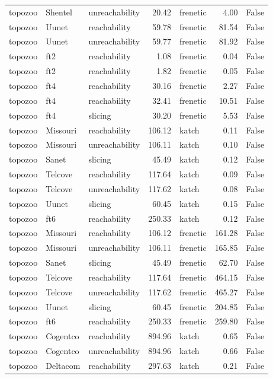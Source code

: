 \begin{tabular}{lllrlrr}
topozoo & Shentel & unreachability & 20.42 & frenetic & 4.00 & False \\
topozoo & Uunet & reachability & 59.78 & frenetic & 81.54 & False \\
topozoo & Uunet & unreachability & 59.77 & frenetic & 81.92 & False \\
topozoo & ft2 & reachability & 1.08 & frenetic & 0.04 & False \\
topozoo & ft2 & reachability & 1.82 & frenetic & 0.05 & False \\
topozoo & ft4 & reachability & 30.16 & frenetic & 2.27 & False \\
topozoo & ft4 & reachability & 32.41 & frenetic & 10.51 & False \\
topozoo & ft4 & slicing & 30.20 & frenetic & 5.53 & False \\
topozoo & Missouri & reachability & 106.12 & katch & 0.11 & False \\
topozoo & Missouri & unreachability & 106.11 & katch & 0.10 & False \\
topozoo & Sanet & slicing & 45.49 & katch & 0.12 & False \\
topozoo & Telcove & reachability & 117.64 & katch & 0.09 & False \\
topozoo & Telcove & unreachability & 117.62 & katch & 0.08 & False \\
topozoo & Uunet & slicing & 60.45 & katch & 0.15 & False \\
topozoo & ft6 & reachability & 250.33 & katch & 0.12 & False \\
topozoo & Missouri & reachability & 106.12 & frenetic & 161.28 & False \\
topozoo & Missouri & unreachability & 106.11 & frenetic & 165.85 & False \\
topozoo & Sanet & slicing & 45.49 & frenetic & 62.70 & False \\
topozoo & Telcove & reachability & 117.64 & frenetic & 464.15 & False \\
topozoo & Telcove & unreachability & 117.62 & frenetic & 465.27 & False \\
topozoo & Uunet & slicing & 60.45 & frenetic & 204.85 & False \\
topozoo & ft6 & reachability & 250.33 & frenetic & 259.80 & False \\
topozoo & Cogentco & reachability & 894.96 & katch & 0.65 & False \\
topozoo & Cogentco & unreachability & 894.96 & katch & 0.66 & False \\
topozoo & Deltacom & reachability & 297.63 & katch & 0.21 & False \\

\end{tabular}
